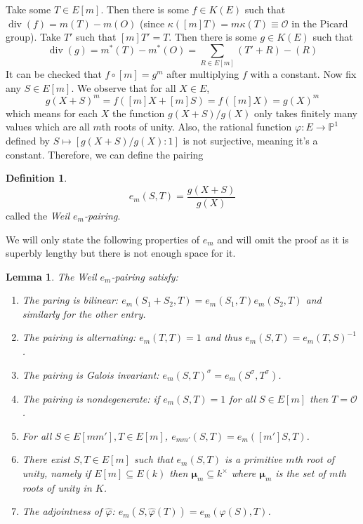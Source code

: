 \documentclass[12pt]{article}
\newtheorem{lemma}{Lemma}[subsection]
\theoremstyle{remark}
\theoremstyle{definition}
\newtheorem{definition}{Definition}[subsection]
\newcommand{\s}[0]{\sigma}
\newcommand{\ecO}[0]{\mathcal O}
\newcommand{\Pc}{\mathbb{P}}   %
\newcommand{\kp}[0]{\kappa}
\newcommand{\pdiv}[0]{\operatorname{div}}
\begin{document}
        Take some $T\in E[m]$. Then there is some $f\in K(E)$ such that $\pdiv(f)=m(T)-m(O)$ (since $\kp([m]T)=m\kp(T)\equiv\ecO$ in the Picard group). Take $T'$ such that $[m]T'=T$. Then there is some $g\in K(E)$ such that
        \[\pdiv(g)=m^*(T)-m^*(O)=\sum_{R\in E[m]}(T'+R)-(R)\]
        It can be checked that $f\circ[m]=g^m$ after multiplying $f$ with a constant. Now fix any $S\in E[m]$. We observe that for all $X\in E$,
        \[g(X+S)^m=f([m]X+[m]S)=f([m]X)=g(X)^m\]
        which means for each $X$ the function $g(X+S)/g(X)$ only takes finitely many values which are all $m$th roots of unity. Also, the rational function $\varphi:E\to \Pc^1$ defined by $S\mapsto[g(X+S)/g(X):1]$ is not surjective, meaning it's a constant. Therefore, we can define the pairing
        \begin{definition}
            \[e_m(S, T)=\frac{g(X+S)}{g(X)}\]
            called the \textit{Weil $e_m$-pairing}.
        \end{definition}
        We will only state the following properties of $e_m$ and will omit the proof as it is superbly lengthy but there is not enough space for it.
        \begin{lemma}\label{lemma-weil-pairing-prop}
            The Weil $e_m$-pairing satisfy:
            \begin{enumerate}[\normalfont(i)]
                \item The paring is bilinear: $e_m(S_1+S_2,T)=e_m(S_1,T)e_m(S_2, T)$ and similarly for the other entry.
                \item The pairing is alternating: $e_m(T, T)=1$ and thus $e_m(S, T)=e_m(T, S)^{-1}$.
                \item The pairing is Galois invariant: $e_m(S, T)^\s=e_m(S^\s, T^\s)$.
                \item The pairing is nondegenerate: if $e_m(S, T)=1$ for all $S\in E[m]$ then $T=\ecO$.
                \item For all $S\in E[mm'], T\in E[m]$, $e_{mm'}(S, T)=e_m([m']S, T)$.
                \item There exist $S, T\in E[m]$ such that $e_m(S, T)$ is a primitive $m$th root of unity, namely if $E[m]\subseteq E(k)$ then $\boldsymbol{\mu}_m\subseteq k^\times$ where $\boldsymbol{\mu}_m$ is the set of $m$th roots of unity in $K$.
                \item The adjointness of $\hat\varphi$: $e_m(S, \hat\varphi(T))=e_m(\varphi(S), T)$.
            \end{enumerate}
        \end{lemma}
\end{document}
